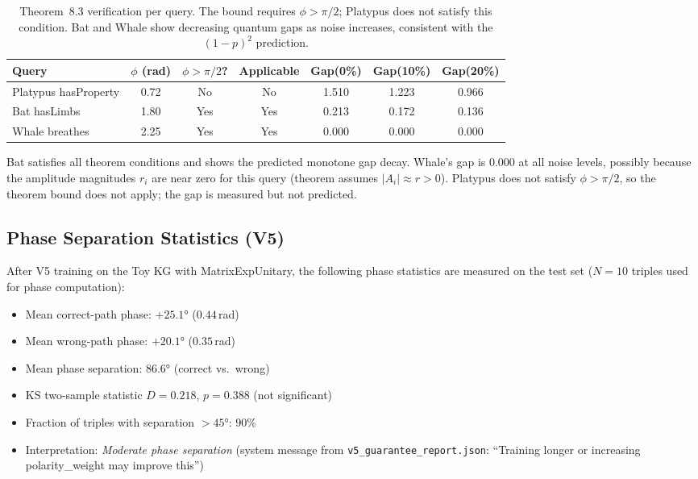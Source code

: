 \documentclass[runningheads]{llncs}
\begin{document}
\begin{table}[t]
\caption{Theorem~8.3 verification per query.  The bound requires $\phi>\pi/2$;
  Platypus does not satisfy this condition.  Bat and Whale show decreasing
  quantum gaps as noise increases, consistent with the $(1-p)^2$ prediction.}
\label{tab:thm83}
\centering
\begin{tabular}{lcccccc}
\toprule
Query & $\phi$ (rad) & $\phi>\pi/2$? & Applicable & Gap(0\%) & Gap(10\%) & Gap(20\%) \\
\midrule
Platypus hasProperty & 0.72 & No  & No  & 1.510 & 1.223 & 0.966 \\
Bat hasLimbs         & 1.80 & Yes & Yes & 0.213 & 0.172 & 0.136 \\
Whale breathes       & 2.25 & Yes & Yes & 0.000 & 0.000 & 0.000 \\
\bottomrule
\end{tabular}
\end{table}

Bat satisfies all theorem conditions and shows the predicted monotone gap decay.
Whale's gap is 0.000 at all noise levels, possibly because the amplitude
magnitudes $r_i$ are near zero for this query (theorem assumes $|A_i|\approx r>0$).
Platypus does not satisfy $\phi>\pi/2$, so the theorem bound does not apply;
the gap is measured but not predicted.

\subsection{Phase Separation Statistics (V5)}

After V5 training on the Toy KG with MatrixExpUnitary, the following phase
statistics are measured on the test set ($N=10$ triples used for phase
computation):

\begin{itemize}
  \item Mean correct-path phase: $+25.1°$ ($0.44$\,rad)
  \item Mean wrong-path phase: $+20.1°$ ($0.35$\,rad)
  \item Mean phase separation: $86.6°$ (correct vs.\ wrong)
  \item KS two-sample statistic $D=0.218$, $p=0.388$ (not significant)
  \item Fraction of triples with separation $>45°$: $90\%$
  \item Interpretation: \textit{Moderate phase separation} (system message from
    \texttt{v5\_guarantee\_report.json}: ``Training longer or increasing
    polarity\_weight may improve this'')
\end{itemize}
\end{document}

